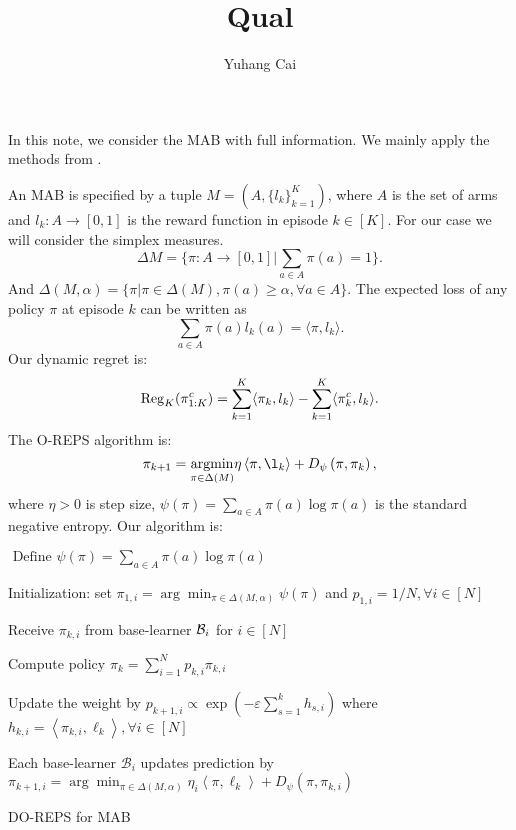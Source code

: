 \documentclass[11pt]{article}
\begin{document}
	\title{Qual}%
  \author{Yuhang Cai} 
	\maketitle

In this note, we consider the MAB with full information. We mainly apply the methods from \citep{zhao2022dynamic}.  

An MAB is specified by a tuple $M = (A,\{l_k\}_{k=1}^K )$, where $A$ is the set of arms and $l_k:A\to [0,1]$ is the reward function in episode $k\in [K]$. For our case we will consider the simplex measures. 
\[
    \Delta M = \{\pi:A\to [0,1]| \sum_{a\in A}\pi(a) =1\}.  
\]
And $\Delta(M,\alpha) = \{\pi| \pi\in \Delta(M), \pi(a) \ge \alpha, \forall a\in A\} $. 
The expected loss of any policy $\pi$ at episode $k$ can be written as 
\[
    \sum_{a\in A} \pi(a) l_k(a) = \langle \pi, l_k \rangle.   
\]
Our dynamic regret is: 
\[
    \mathrm{Reg}_K (\pi^c_{1:K}) = \sum_{k=1}^K \langle \pi_k, l_k \rangle - \sum_{k=1}^K \langle \pi_k^c, l_k \rangle . 
\]
The O-REPS algorithm is: 
$$
\pi_{k+1}=\underset{\pi \in \Delta(M)}{\argmin } \eta\left\langle \pi, \l_k\right\rangle+D_\psi\left(\pi, \pi_k\right),
$$
where $\eta>0$ is step size, $\psi(\pi)=\sum_{a\in A} \pi(a) \log \pi( a)$ is the standard negative entropy.
Our algorithm is: 
\begin{algorithm}[!ht]
\DontPrintSemicolon
{}
$\text { Define } \psi(\pi)=\sum_{a\in A} \pi(a) \log \pi(a)$ 

Initialization: set $\pi_{1, i}=\arg \min _{\pi \in \Delta(M, \alpha)} \psi(\pi)$ and $p_{1, i}=1 / N, \forall i \in[N]$

{
    Receive $\pi_{k,i}$ from base-learner $\mathcal{B}_i$ for $i\in [N]$

    Compute policy $\pi_k = \sum_{i=1}^N p_{k,i}\pi_{k,i}$ 

    Update the weight by $p_{k+1, i} \propto \exp \left(-\varepsilon \sum_{s=1}^k h_{s, i}\right)$ where $h_{k, i}=\left\langle \pi_{k,i}, \ell_k\right\rangle, \forall i \in[N]$

    Each base-learner $\mathcal{B}_i$ updates prediction by $\pi_{k+1, i}=\arg \min _{\pi \in \Delta(M, \alpha)} \eta_i\left\langle \pi, \ell_k\right\rangle+D_\psi\left(\pi, \pi_{k, i}\right)$
}
\caption{DO-REPS for MAB}
\end{algorithm}
\end{document}

